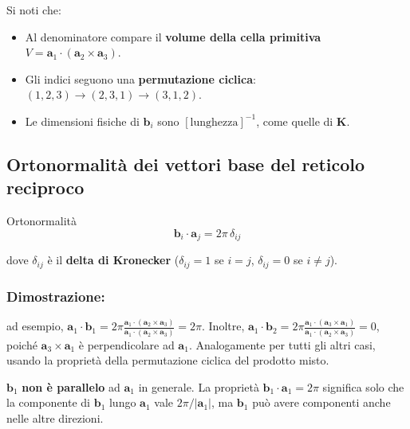 Si noti che:
\begin{itemize}
    \item Al denominatore compare il \textbf{volume della cella primitiva} $V = \mathbf{a}_1 \cdot (\mathbf{a}_2 \times \mathbf{a}_3)$.
    \item Gli indici seguono una \textbf{permutazione ciclica}: $(1,2,3) \to (2,3,1) \to (3,1,2)$.
    \item Le dimensioni fisiche di $\mathbf{b}_i$ sono $[\text{lunghezza}]^{-1}$, come quelle di $\mathbf{K}$.
\end{itemize}

\subsection{Ortonormalità dei vettori base del reticolo reciproco}

\begin{equazione}{Ortonormalità}
\begin{equation}
\mathbf{b}_i \cdot \mathbf{a}_j = 2\pi \, \delta_{ij}
\end{equation}
\end{equazione}

dove $\delta_{ij}$ è il \textbf{delta di Kronecker} ($\delta_{ij} = 1$ se $i = j$, $\delta_{ij} = 0$ se $i \neq j$).


\subsubsection{Dimostrazione:} 

ad esempio, $\mathbf{a}_1 \cdot \mathbf{b}_1 = 2\pi \frac{\mathbf{a}_1 \cdot (\mathbf{a}_2 \times \mathbf{a}_3)}{\mathbf{a}_1 \cdot (\mathbf{a}_2 \times \mathbf{a}_3)} = 2\pi$. Inoltre, $\mathbf{a}_1 \cdot \mathbf{b}_2 = 2\pi \frac{\mathbf{a}_1 \cdot (\mathbf{a}_3 \times \mathbf{a}_1)}{\mathbf{a}_1 \cdot (\mathbf{a}_2 \times \mathbf{a}_3)} = 0$, poiché $\mathbf{a}_3 \times \mathbf{a}_1$ è perpendicolare ad $\mathbf{a}_1$. Analogamente per tutti gli altri casi, usando la proprietà della permutazione ciclica del prodotto misto.

\begin{nota}
$\mathbf{b}_1$ \textbf{non è parallelo} ad $\mathbf{a}_1$ in generale. La proprietà $\mathbf{b}_1 \cdot \mathbf{a}_1 = 2\pi$ significa solo che la componente di $\mathbf{b}_1$ lungo $\mathbf{a}_1$ vale $2\pi/|\mathbf{a}_1|$, ma $\mathbf{b}_1$ può avere componenti anche nelle altre direzioni.
\end{nota}

